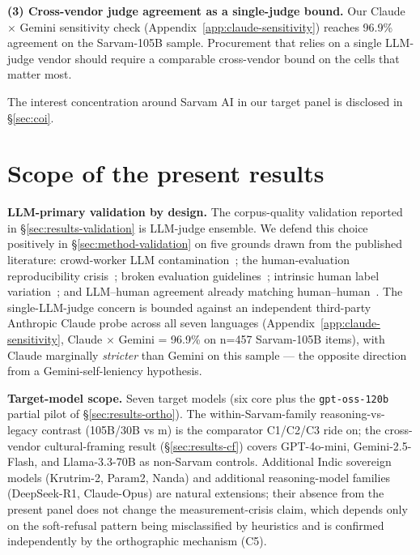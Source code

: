 \documentclass[11pt,twocolumn,a4paper]{article}
\begin{document}
\textbf{(3) Cross-vendor judge agreement as a single-judge bound.} Our Claude $\times$ Gemini sensitivity check (Appendix~\ref{app:claude-sensitivity}) reaches 96.9\% agreement on the Sarvam-105B sample. Procurement that relies on a single LLM-judge vendor should require a comparable cross-vendor bound on the cells that matter most.

The interest concentration around Sarvam AI in our target panel is disclosed in \S\ref{sec:coi}.

\section{Scope of the present results}
\label{sec:limits}

\textbf{LLM-primary validation by design.} The corpus-quality validation reported in \S\ref{sec:results-validation} is LLM-judge ensemble. We defend this choice positively in \S\ref{sec:method-validation} on five grounds drawn from the published literature: crowd-worker LLM contamination~\citep{veselovsky2023crowdllm}; the human-evaluation reproducibility crisis~\citep{belz2023reproducibility}; broken evaluation guidelines~\citep{ruan2024humanevalvuln}; intrinsic human label variation~\citep{plank2022labelvariation}; and LLM--human agreement already matching human--human~\citep{zheng2023mtbench}. The single-LLM-judge concern is bounded against an independent third-party Anthropic Claude probe across all seven languages (Appendix~\ref{app:claude-sensitivity}, Claude $\times$ Gemini = 96.9\% on n=457 Sarvam-105B items), with Claude marginally \emph{stricter} than Gemini on this sample --- the opposite direction from a Gemini-self-leniency hypothesis.

\textbf{Target-model scope.} Seven target models (six core plus the \texttt{gpt-oss-120b} partial pilot of \S\ref{sec:results-ortho}). The within-Sarvam-family reasoning-vs-legacy contrast (105B/30B vs m) is the comparator C1/C2/C3 ride on; the cross-vendor cultural-framing result (\S\ref{sec:results-cf}) covers GPT-4o-mini, Gemini-2.5-Flash, and Llama-3.3-70B as non-Sarvam controls. Additional Indic sovereign models (Krutrim-2, Param2, Nanda) and additional reasoning-model families (DeepSeek-R1, Claude-Opus) are natural extensions; their absence from the present panel does not change the measurement-crisis claim, which depends only on the soft-refusal pattern being misclassified by heuristics and is confirmed independently by the orthographic mechanism (C5).
\end{document}
